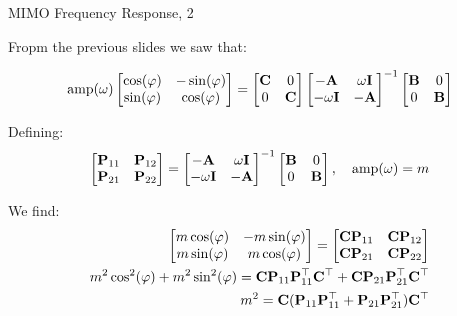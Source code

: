 \documentclass{beamer}
\begin{document}
\begin{frame}{MIMO Frequency Response, 2}
	\begin{flushleft}
		
		Fropm the previous slides we saw that:
		
		\begin{align*}
			 \text{amp}(\omega)
			\begin{bmatrix}
				\cos(\varphi) & -\sin(\varphi) \\
				\sin(\varphi) & \cos(\varphi)
			\end{bmatrix}
			= 
			\begin{bmatrix}
				\mathbf{C} & 0 \\  0 & \mathbf{C}
			\end{bmatrix}
			\begin{bmatrix}
				-\mathbf{A} & \omega \mathbf{I} \\
				-\omega \mathbf{I} & -\mathbf{A}
			\end{bmatrix}^{-1}
			\begin{bmatrix}
				\mathbf{B} & 0 \\  0 & \mathbf{B}
			\end{bmatrix}
		\end{align*}		
		
		Defining:
		\begin{align}
			\begin{bmatrix}
				\mathbf{P} _{11} & \mathbf{P} _{12} \\
				\mathbf{P} _{21} & \mathbf{P} _{22}
			\end{bmatrix}
			= 
			\begin{bmatrix}
				-\mathbf{A} & \omega \mathbf{I} \\
				-\omega \mathbf{I} & -\mathbf{A}
			\end{bmatrix}^{-1}
			\begin{bmatrix}
				\mathbf{B} & 0 \\  0 & \mathbf{B}
			\end{bmatrix},
			\ \ \
			\text{amp}(\omega) = m
		\end{align}		
		
		We find:
		\begin{align}
			\begin{bmatrix}
				m\cos(\varphi) & -m\sin(\varphi) \\
				m\sin(\varphi) & m\cos(\varphi)
			\end{bmatrix}
			= 
			\begin{bmatrix}
			\mathbf{C}\mathbf{P} _{11} & \mathbf{C}\mathbf{P} _{12} \\
			\mathbf{C}\mathbf{P} _{21} & \mathbf{C}\mathbf{P} _{22}
			\end{bmatrix}
			\\
			m^2\cos^2(\varphi) + m^2\sin^2(\varphi)
		= 
		\mathbf{C}\mathbf{P} _{11} \mathbf{P} _{11}^\top \mathbf{C}^\top + 
		\mathbf{C}\mathbf{P} _{21} \mathbf{P} _{21}^\top \mathbf{C}^\top
		\\
		m^2
		= 
		\mathbf{C}(\mathbf{P} _{11} \mathbf{P} _{11}^\top +\mathbf{P} _{21} \mathbf{P} _{21}^\top  )\mathbf{C}^\top
		\end{align}		
		
		
		
	\end{flushleft}
\end{frame}
\end{document}
